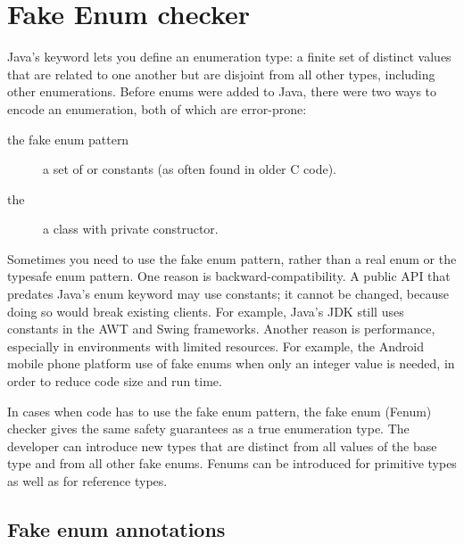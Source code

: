 \htmlhr
\chapter{Fake Enum checker\label{fenum-checker}}

Java's 
keyword lets you define an enumeration type: a finite set of distinct values
that are related to one another but are disjoint from all other
types, including other enumerations.
Before enums were added to Java, there were two ways to encode an
enumeration, both of which are error-prone:

\begin{description}
\item[the fake enum pattern]  a set of  or 
  constants (as often found in older C code).

\item[the ]  a class with private constructor.
\end{description}

Sometimes you need to use the fake enum pattern,
rather than a real enum or the typesafe enum pattern.
%
One reason is backward-compatibility.  A public API that predates Java's
enum keyword may use  constants; it cannot be changed, because
doing so would break existing clients.  For example, Java's JDK still uses
 constants in the AWT and Swing frameworks.
%
Another reason is performance, especially in environments with limited
resources.  For example, the Android mobile phone platform
use of fake enums when only an integer value is needed, in order to reduce
code size and run time.

In cases when code has to use the fake enum pattern, the fake enum (Fenum)
checker gives the same safety guarantees as a true enumeration type. 
The developer can introduce new types that are distinct from all values of the
base type and from all other fake enums. Fenums can be introduced for
primitive types as well as for reference types.


\section{Fake enum annotations\label{fenum-annotations}}

